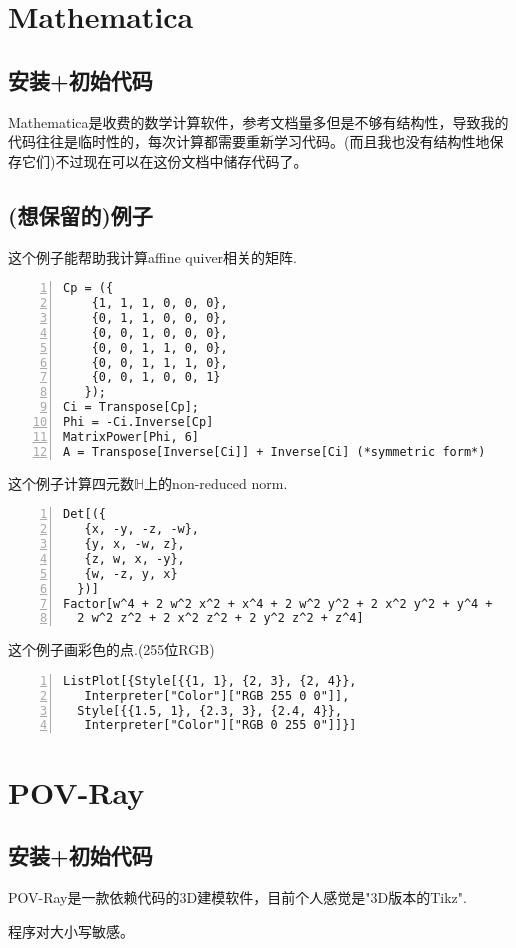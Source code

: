 \documentclass[11pt]{amsart}
\begin{document}
\section{Mathematica}
\subsection{安装+初始代码}
Mathematica是收费的数学计算软件，参考文档量多但是不够有结构性，导致我的代码往往是临时性的，每次计算都需要重新学习代码。(而且我也没有结构性地保存它们)不过现在可以在这份文档中储存代码了。

\subsection{(想保留的)例子}

这个例子能帮助我计算affine quiver相关的矩阵.
\begin{lstlisting}[numbers=left,numberstyle=\tiny,numbersep=10pt]
Cp = ({
    {1, 1, 1, 0, 0, 0},
    {0, 1, 1, 0, 0, 0},
    {0, 0, 1, 0, 0, 0},
    {0, 0, 1, 1, 0, 0},
    {0, 0, 1, 1, 1, 0},
    {0, 0, 1, 0, 0, 1}
   });
Ci = Transpose[Cp];
Phi = -Ci.Inverse[Cp]
MatrixPower[Phi, 6]
A = Transpose[Inverse[Ci]] + Inverse[Ci] (*symmetric form*)
\end{lstlisting}
这个例子计算四元数$\mathbb{H}$上的non-reduced norm.
\begin{lstlisting}[numbers=left,numberstyle=\tiny,numbersep=10pt]
Det[({
   {x, -y, -z, -w},
   {y, x, -w, z},
   {z, w, x, -y},
   {w, -z, y, x}
  })]
Factor[w^4 + 2 w^2 x^2 + x^4 + 2 w^2 y^2 + 2 x^2 y^2 + y^4 + 
  2 w^2 z^2 + 2 x^2 z^2 + 2 y^2 z^2 + z^4]
\end{lstlisting}
这个例子画彩色的点.(255位RGB)
\begin{lstlisting}[numbers=left,numberstyle=\tiny,numbersep=10pt]
ListPlot[{Style[{{1, 1}, {2, 3}, {2, 4}}, 
   Interpreter["Color"]["RGB 255 0 0"]], 
  Style[{{1.5, 1}, {2.3, 3}, {2.4, 4}}, 
   Interpreter["Color"]["RGB 0 255 0"]]}]
\end{lstlisting}
\section{POV-Ray}
\subsection{安装+初始代码}
POV-Ray是一款依赖代码的3D建模软件，目前个人感觉是"3D版本的Tikz".

程序对大小写敏感。
\end{document}
